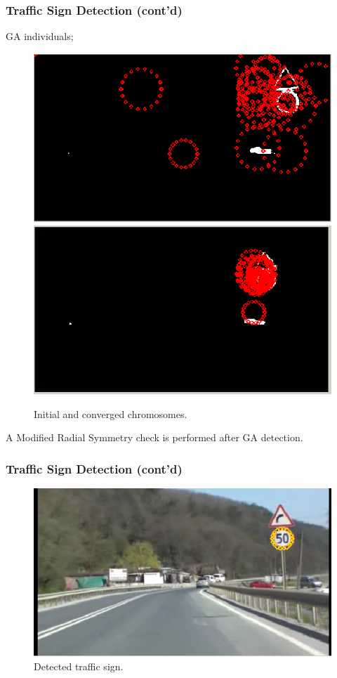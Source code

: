 \documentclass{beamer}
\begin{document}
\frame
{
  \frametitle{Traffic Sign Detection (cont'd)}
	GA individuals;
	\begin{figure}[ht]
	\begin{center}
	\includegraphics[height=.3\paperheight]{../img/sdfig3.eps}
	\includegraphics[height=.3\paperheight]{../img/sdfig4.eps}
	\caption{Initial and converged chromosomes.}
	\label{fig:sdfig4}
	\end{center}
	\end{figure}
	A Modified Radial Symmetry check is performed after GA detection.	
}

\frame
{
  \frametitle{Traffic Sign Detection (cont'd)}
  \begin{figure}[ht]
	\begin{center}
	\includegraphics[width=.8\paperwidth]{../img/sdfig5.eps}
	\caption{Detected traffic sign.}
	\label{fig:sdfig5}
	\end{center}
	\end{figure}
}
\end{document}
